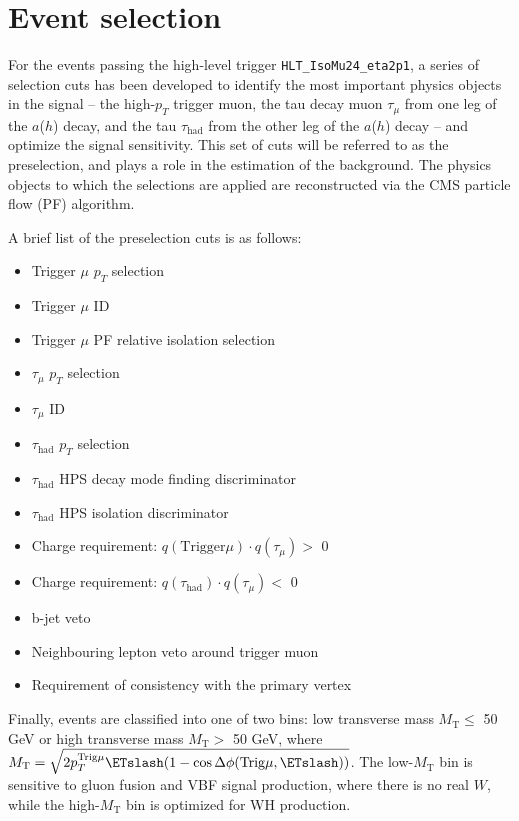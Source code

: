 \chapter{Event selection\label{sec:evtsel}}

For the events passing the high-level trigger \texttt{HLT\_IsoMu24\_eta2p1}, a series of selection cuts has been developed to identify the most important physics objects in the signal -- the high-$p_T$ trigger muon, the tau decay muon $\tau_{\mu}$ from one leg of the $a$($h$) decay, and the tau $\tau_{\text{had}}$ from the other leg of the $a$($h$) decay -- and optimize the signal sensitivity. This set of cuts will be referred to as the preselection, and plays a role in the estimation of the background. The physics objects to which the selections are applied are reconstructed via the CMS particle flow (PF) algorithm.

A brief list of the preselection cuts is as follows:

\begin{itemize}
	\item Trigger $\mu$ $p_T$ selection
	\item Trigger $\mu$ ID
	\item Trigger $\mu$ PF relative isolation selection
	\item $\tau_{\mu}$ $p_T$ selection
	\item $\tau_{\mu}$ ID
	\item $\tau_{\text{had}}$ $p_T$ selection
	\item $\tau_{\text{had}}$ HPS decay mode finding discriminator
	\item $\tau_{\text{had}}$ HPS isolation discriminator
	\item Charge requirement: $q(\text{Trigger} \mu) \cdot q(\tau_{\mu}) >$ 0
	\item Charge requirement: $q(\tau_{\text{had}}) \cdot q(\tau_{\mu}) <$ 0
        \item b-jet veto
        \item Neighbouring lepton veto around trigger muon
	\item Requirement of consistency with the primary vertex
\end{itemize}

Finally, events are classified into one of two bins: low transverse mass $M_{\text{T}} \le$ 50 GeV or high transverse mass $M_{\text{T}} >$ 50 GeV, where $M_{\text{T}} = \sqrt{2p_{T}^{\text{Trig}\mu}\ETslash(1 - \cos{\Delta\phi(\text{Trig}\mu, \ETslash)})}$.  The low-$M_{\text{T}}$ bin is sensitive to gluon fusion and VBF signal production, where there is no real $W$, while the high-$M_{\text{T}}$ bin is optimized for WH production.

